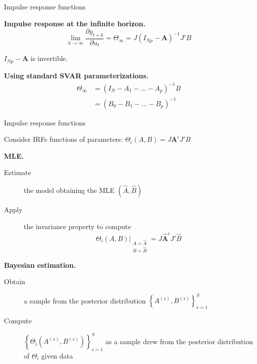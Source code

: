 \documentclass[notes,blackandwhite,mathsans,usenames,dvipsnames]{beamer}
\begin{document}
\begin{frame}{Impulse response functions}

\textbf{Impulse response at the infinite horizon.}
$$ \lim_{h\rightarrow\infty}\frac{\partial y_{t+h}}{\partial u_t} = \Theta_{\infty} =  J\left(I_{Np}-\mathbf{A}\right)^{-1}J'B $$

 $I_{Np}-\mathbf{A}$ {\color{mcxs2}is invertible.}

\bigskip\textbf{Using standard SVAR parameterizations.}
\begin{align*}
\Theta_{\infty} &= \left( I_N - A_1 - \dots - A_p \right)^{-1}B\\
&= \left( B_0 - B_1 - \dots - B_p \right)^{-1}
\end{align*}

\end{frame}





\begin{frame}{Impulse response functions}

\bigskip Consider IRFs functions of parameters: $ \Theta_i(A,B) = J\mathbf{A}^iJ'B $

\bigskip\textbf{MLE.}
\begin{description}
\item[Estimate] {\color{mcxs2}the model obtaining the MLE} $(\widehat{A},\widehat{B})$
\item[Apply] {\color{mcxs2}the} {\color{purple}invariance property} {\color{mcxs2}to compute}
$$ \Theta_i(A,B)\Big|_{\begin{array}{c} A=\widehat{A}\\ B=\widehat{B}\end{array}} = J\widehat{\mathbf{A}}^iJ'\widehat{B} $$
\end{description}


\bigskip\textbf{Bayesian estimation.}
\begin{description}
\item[Obtain] {\color{mcxs2}a sample from the posterior distribution} $\left\{ A^{(s)},B^{(s)} \right\}_{s=1}^{S}$
\item[Compute] $\left\{\Theta_i\left(A^{(s)},B^{(s)}\right)\right\}_{s=1}^{S}$ {\color{mcxs2}as a sample drew from the posterior distribution of} $\Theta_i$ {\color{mcxs2}given data}
\end{description}

\end{frame}
\end{document}
